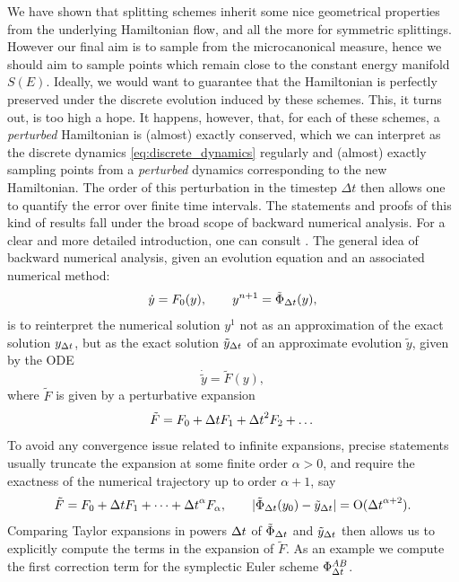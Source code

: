     We have shown that splitting schemes inherit some nice geometrical properties from the underlying Hamiltonian flow, and all the more for symmetric splittings.
    However our final aim is to sample from the microcanonical measure, hence we should aim to sample points which remain close to the constant energy manifold $S(E)$.
    Ideally, we would want to guarantee that the Hamiltonian is perfectly preserved under the discrete evolution induced by these schemes. This, it turns out, is too high a hope.
    It happens, however, that, for each of these schemes, a \textit{perturbed} Hamiltonian is (almost) exactly conserved, which we can interpret as the discrete dynamics \eqref{eq:discrete_dynamics} regularly  and (almost) exactly sampling points from a \textit{perturbed} dynamics corresponding to the new Hamiltonian.
    The order of this perturbation in the timestep $\Delta t$ then allows one to quantify the error over finite time intervals. The statements and proofs of this kind of results fall under the broad scope of backward numerical analysis. For a clear and more detailed introduction, one can consult \cite[Section 4]{HLG03}.
    The general idea of backward numerical analysis, given an evolution equation and an associated numerical method:
    \[\dot y = F_0(y),\qquad y^{n+1} = \tilde\Phi_{{\Delta t}}(y),\]
    is to reinterpret the numerical solution $y^1$ not as an approximation of the exact solution $y_{{\Delta t}}$, but as the exact solution $\tilde y_{{\Delta t}}$ of an approximate evolution $\tilde y$, given by the ODE
    \[\dot{\tilde y}=\tilde F(y),\]
    where $\tilde F$ is given by a perturbative expansion
    \[\tilde F=F_0 + {\Delta t} F_1 + {\Delta t}^2 F_2 +\dots\]
    To avoid any convergence issue related to infinite expansions, precise statements usually truncate the expansion at some finite order $\alpha>0$, and require the exactness of the numerical trajectory up to order $\alpha+1$, say
    \[\tilde F=F_0 + {\Delta t} F_1 + \dots + {\Delta t}^\alpha F_\alpha,\qquad |\tilde \Phi_{\Delta t}(y_0) - \tilde y_{\Delta t}|= \mathrm{O}({\Delta t}^{\alpha+2}).\]
    Comparing Taylor expansions in powers ${\Delta t}$ of $\tilde\Phi_{\Delta t}$ and $\tilde y_{{\Delta t}}$ then allows us to explicitly compute the terms in the expansion of $\tilde F$.
    As an example we compute the first correction term for the symplectic Euler scheme $\Phi_{{\Delta t}}^{AB}$.
